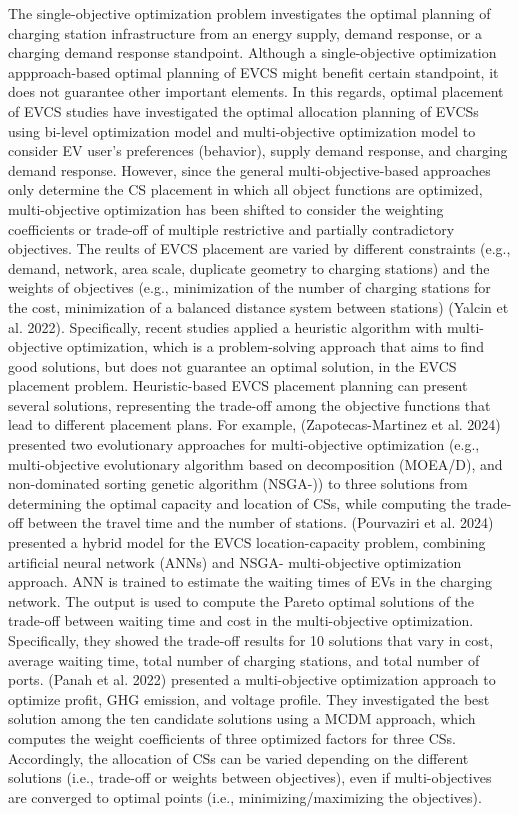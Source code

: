 \documentclass[preprint,12pt]{elsarticle}
\begin{document}
The single-objective optimization problem investigates the optimal planning of charging station infrastructure from an energy supply, demand response, or a charging demand response standpoint. Although a single-objective optimization appproach-based optimal planning of EVCS might benefit certain standpoint, it does not guarantee other important elements. In this regards, optimal placement of EVCS studies have investigated the optimal allocation planning of EVCSs using bi-level optimization model and multi-objective optimization model to consider EV user's preferences (behavior), supply demand response, and charging demand response. However, since the general multi-objective-based approaches only determine the CS placement in which all object functions are optimized, multi-objective optimization has been shifted to consider the weighting coefficients or trade-off of multiple restrictive and partially contradictory objectives. The reults of EVCS placement are varied by different constraints (e.g., demand, network, area scale, duplicate geometry to charging stations) and the weights of objectives (e.g., minimization of the number of charging stations for the cost, minimization of a balanced distance system between stations) (Yalcin et al. 2022). Specifically, recent studies applied a heuristic algorithm with multi-objective optimization, which is a problem-solving approach that aims to find good solutions, but does not guarantee an optimal solution, in the EVCS placement problem. Heuristic-based EVCS placement planning can present several solutions, representing the trade-off among the objective functions that lead to different placement plans. For example, (Zapotecas-Martinez et al. 2024) presented two evolutionary approaches for multi-objective optimization (e.g., multi-objective evolutionary algorithm based on decomposition (MOEA/D), and non-dominated sorting genetic algorithm  (NSGA-)) to three solutions from determining the optimal capacity and location of CSs, while computing the trade-off between the travel time and the number of stations. (Pourvaziri et al. 2024) presented a hybrid model for the EVCS location-capacity problem, combining artificial neural network (ANNs) and NSGA- multi-objective optimization approach. ANN is trained to estimate the waiting times of EVs in the charging network. The output is used to compute the Pareto optimal solutions of the trade-off between waiting time and cost in the multi-objective optimization. Specifically, they showed the trade-off results for 10 solutions that vary in cost, average waiting time, total number of charging stations, and total number of ports. (Panah et al. 2022) presented a multi-objective optimization approach to optimize profit, GHG emission, and voltage profile. They investigated the best solution among the ten candidate solutions using a MCDM approach, which computes the weight coefficients of three optimized factors for three CSs. Accordingly, the allocation of CSs can be varied depending on the different solutions (i.e., trade-off or weights between objectives), even if multi-objectives are converged to optimal points (i.e., minimizing/maximizing the objectives). 
\end{document}

